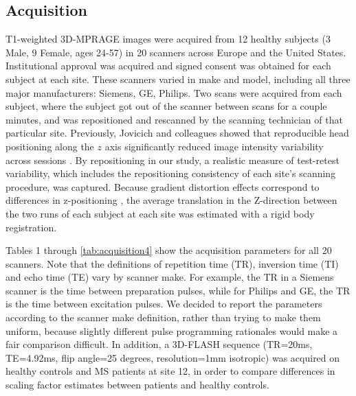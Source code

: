 \subsection{Acquisition}
T1-weighted 3D-MPRAGE images were acquired from 12 healthy subjects (3 Male, 9 Female, ages 24-57) in 20 scanners across Europe and the United States. Institutional approval was acquired and signed consent was obtained for each subject at each site. These scanners varied in make and model, including all three major manufacturers: Siemens, GE, Philips. Two scans were acquired from each subject, where the subject got out of the scanner between scans for a couple minutes, and was repositioned and rescanned by the scanning technician of that particular site. Previously, Jovicich and colleagues showed that reproducible head positioning along the $z$ axis significantly reduced image intensity variability across sessions \cite{freesurferReliability}. By repositioning in our study, a realistic measure of test-retest variability, which includes the repositioning consistency of each site's scanning procedure, was captured. Because gradient distortion effects correspond to differences in z-positioning \cite{caramanos2010gradient}, the average translation in the Z-direction between the two runs of each subject at each site was estimated with a rigid body registration. 

Tables 1 through \ref{tab:acquisition4} show the acquisition parameters for all 20 scanners. Note that the definitions of repetition time (TR), inversion time (TI) and echo time (TE) vary by scanner make. For example, the TR in a Siemens scanner is the time between preparation pulses, while for Philips and GE, the TR is the time between excitation pulses. We decided to report the parameters according to the scanner make definition, rather than trying to make them uniform, because slightly different pulse programming rationales would make a fair comparison difficult. In addition, a 3D-FLASH sequence (TR=20ms, TE=4.92ms, flip angle=25 degrees, resolution=1mm isotropic) was acquired on healthy controls and MS patients at site 12, in order to compare differences in scaling factor estimates between patients and healthy controls. 